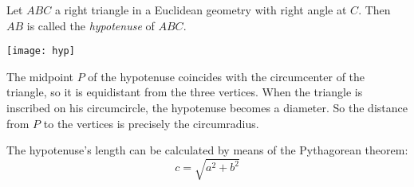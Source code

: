 \documentclass{article}
\begin{document}
Let $ABC$ a right triangle in a Euclidean geometry with right angle at $C$. Then $AB$ is called the \emph{hypotenuse} of $ABC$.

\begin{center}
\texttt{[image: hyp]}
\end{center}

The midpoint $P$ of the hypotenuse coincides with the circumcenter of the triangle, so it is equidistant from the three vertices. When the triangle is inscribed on his circumcircle, the hypotenuse becomes a diameter. So the distance from $P$ to the vertices is precisely the circumradius.

The hypotenuse's length can be calculated by means of the Pythagorean theorem:
$$c=\sqrt{a^2+b^2}$$

\end{document}
